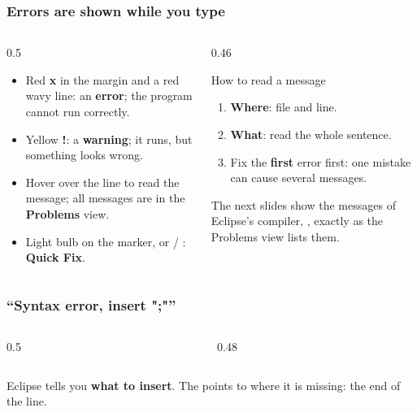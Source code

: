 \documentclass[aspectratio=169,10pt,compress]{beamer}
\begin{document}
\begin{frame}[t,fragile] \frametitle{Errors are shown while you type}
  \begin{columns}[T]
    \begin{column}{0.5\textwidth}
      \begin{itemize}\small
        \item Red \textbf{x} in the margin and a red wavy line: an \textbf{error}; the program cannot run correctly.
        \item Yellow \textbf{!}: a \textbf{warning}; it runs, but something looks wrong.
        \item Hover over the line to read the message; all messages are in the \textbf{Problems} view.
        \item Light bulb on the marker, or  / : \textbf{Quick Fix}.
      \end{itemize}
    \end{column}
    \begin{column}{0.46\textwidth}
      \begin{block}{How to read a message}
        \small
        \begin{enumerate}
          \item \textbf{Where}: file and line.
          \item \textbf{What}: read the whole sentence.
          \item Fix the \textbf{first} error first: one mistake can cause several messages.
        \end{enumerate}
      \end{block}
      \small The next slides show the messages of Eclipse's compiler, , exactly as the Problems view lists them.
    \end{column}
  \end{columns}
\end{frame}




\begin{frame}[t,fragile] \frametitle{``Syntax error, insert ";"''}
  \begin{columns}[T]
    \begin{column}{0.5\textwidth}
    \end{column}
    \begin{column}{0.48\textwidth}
    \end{column}
  \end{columns}

  \vspace{0.2em}
  \small Eclipse tells you \textbf{what to insert}. The \hCode{\textasciicircum} points to where it is missing: the end of the line.
\end{frame}
\end{document}
